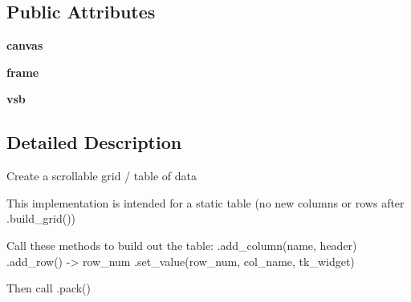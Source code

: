 \subsection*{Public Attributes}
\begin{DoxyCompactItemize}
\item 
\hypertarget{classetl_1_1tk__monitor_1_1TkScrollableGrid_1_1TkScrollableGrid_a9c7dceb3951354ae371dc9459ed4df74}{{\bfseries canvas}}\label{classetl_1_1tk__monitor_1_1TkScrollableGrid_1_1TkScrollableGrid_a9c7dceb3951354ae371dc9459ed4df74}

\item 
\hypertarget{classetl_1_1tk__monitor_1_1TkScrollableGrid_1_1TkScrollableGrid_a863f018920fef2aeadc595b2b45dc267}{{\bfseries frame}}\label{classetl_1_1tk__monitor_1_1TkScrollableGrid_1_1TkScrollableGrid_a863f018920fef2aeadc595b2b45dc267}

\item 
\hypertarget{classetl_1_1tk__monitor_1_1TkScrollableGrid_1_1TkScrollableGrid_a4ff041cebfd288257c28582a8678ef93}{{\bfseries vsb}}\label{classetl_1_1tk__monitor_1_1TkScrollableGrid_1_1TkScrollableGrid_a4ff041cebfd288257c28582a8678ef93}

\end{DoxyCompactItemize}


\subsection{Detailed Description}
\begin{DoxyVerb}Create a scrollable grid / table of data

This implementation is intended for a static table (no new columns or rows
after .build_grid())

Call these methods to build out the table:
  .add_column(name, header)
  .add_row() -> row_num
  .set_value(row_num, col_name, tk_widget)
  
Then call .pack()
\end{DoxyVerb}
 


